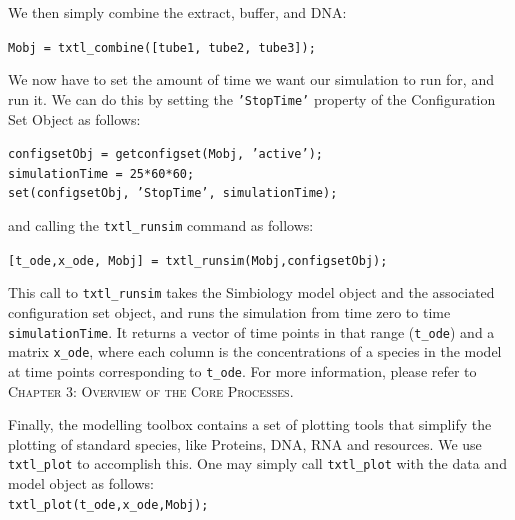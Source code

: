 \documentclass[english]{report}
\begin{document}
We then simply combine the extract, buffer, and DNA:

				\begin{flushleft}
						\texttt{Mobj = txtl\_combine([tube1, tube2, tube3]);} \\	
				\end{flushleft}
							
We now have to set the amount of time we want our simulation to run for, and run it. We can do this by setting the \texttt{'StopTime'} property of the Configuration Set Object as follows:

				\begin{flushleft}
						\texttt{configsetObj = getconfigset(Mobj, 'active');\\
simulationTime = 25*60*60;\\
set(configsetObj, 'StopTime', simulationTime);} \\	
				\end{flushleft}		
and calling the \texttt{txtl\_runsim} command as follows:	

				\begin{flushleft}
						\texttt{[t\_ode,x\_ode, Mobj] = txtl\_runsim(Mobj,configsetObj);} \\	
				\end{flushleft}	
This call to \texttt{txtl\_runsim} takes the Simbiology model object and the associated configuration set object, and runs the simulation from time zero to time \texttt{simulationTime}. It returns a vector of time points in that range (\texttt{t\_ode}) and a matrix \texttt{x\_ode}, where each column is the concentrations of a species in the model at time points corresponding to \texttt{t\_ode}. For more information, please refer to \textsc{Chapter 3: Overview of the Core Processes}. 

Finally, the modelling toolbox contains a set of plotting tools that simplify the plotting of standard species, like Proteins, DNA, RNA and resources. We use \texttt{txtl\_plot} to accomplish this. One may simply call \texttt{txtl\_plot} with the data and model object as follows: \\

\noindent \texttt{txtl\_plot(t\_ode,x\_ode,Mobj); \\}
\end{document}
